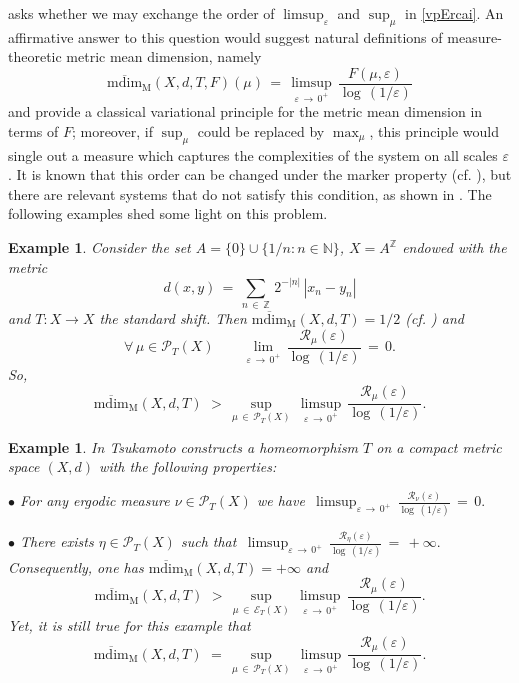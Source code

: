 \documentclass[11pt,a4paper,reqno]{amsart}
\theoremstyle{plain}
\newtheorem{example}[theorem]{Example}
\theoremstyle{definition}
\newcommand{\field}[1]{\mathbb{#1}}
\newcommand{\ZZ}{\field{Z}}
\newcommand{\NN}{\field{N}}
\newcommand{\ep} {\varepsilon}
\newcommand{\vep}{\varepsilon}
\newcommand{\cP}{{\mathcal P}}
\begin{document}
asks whether we may exchange the order of $\limsup_\ep$ and $\sup_\mu$ in \eqref{vpErcai}. An affirmative answer to this question would suggest natural definitions of measure-theoretic metric mean dimension, namely 
$$\mathrm{\overline{mdim}_M}(X,d,T,F)(\mu) \, = \, \limsup_{\varepsilon \, \to \, 0^+}\,\frac{F(\mu, \vep)}{\log\,(1/\varepsilon)}$$
and provide a classical variational principle for the metric mean dimension in terms of $F$; moreover, if $\sup_\mu$ could be replaced by $\max_\mu$, this principle would single out a measure which captures the complexities of the system on all scales $\vep$. It is known that this order can be changed under the marker property (cf. \cite{LT19}), but there are relevant systems that do not satisfy this condition, as shown in \cite{Shi23, TTY}. The following examples shed some light on this problem. 

\smallskip

\begin{example}\cite[Section VIII]{LT18}\label{ex:RT2} \emph{Consider the set $A = \{0\}\cup \{1/n \colon n \in \NN\}$, $X = A^\ZZ$ endowed with the metric
$$d(x,y) \, = \, \sum_{n \, \in \, \ZZ}\, 2^{-|n|} \, |x_n - y_n|$$
and $T \colon X \to X$ the standard shift. Then $\mathrm{\overline{mdim}_M}(X,d,T)= 1/2$ (cf. \cite{VV}) and 
$$\forall \, \mu \in \cP_T(X) \quad \quad \lim_{\vep \, \to \, 0^+}\, \frac{\mathcal{R}_\mu(\vep)}{\log \, (1/\vep)} \, = \, 0.$$
So,
$$\mathrm{\overline{mdim}_M}(X,d,T)\,\, >\, \sup_{\mu \, \in \, \mathcal{P}_T(X)} \,\limsup_{\vep \, \to \, 0^+} \, \frac{\mathcal{R}_\mu(\vep)}{\log \, (1/\vep)}.$$}
\end{example}


\smallskip

\begin{example}\cite[Theorem 1.4]{Tsu2025}\label{ex:RT} \emph{In \cite{Tsu2025} Tsukamoto constructs a homeomorphism $T$ on a compact metric space $(X,d)$ with the following properties:}

\noindent \emph{$\bullet$ For any ergodic measure $\nu \in \cP_T(X)$ we have $\,\displaystyle \limsup_{\vep \, \to \, 0^+} \, \frac{\mathcal{R}_\nu(\vep)}{\log \, (1/\vep)}\, =\, 0.$}

\noindent \emph{$\bullet$ There exists $\eta \in \cP_T(X)$ such that 
$\,\displaystyle \limsup_{\vep \, \to \, 0^+} \, \frac{\mathcal{R}_\eta(\vep)}{\log \, (1/\vep)}\, =\, +\infty.$}\\

\noindent \emph{Consequently, one has $\mathrm{\overline{mdim}_M}(X,d,T) = +\infty$ and
$$\mathrm{\overline{mdim}_M}(X,d,T)\,\, > \,  \sup_{\mu \, \in \, \mathcal{E}_T(X)} \,\limsup_{\vep \, \to \, 0^+} \, \frac{\mathcal{R}_\mu(\vep)}{\log \, (1/\vep)}.$$
Yet, it is still true for this example that 
\begin{equation}\label{ExTsukamoto}
    \mathrm{\overline{mdim}_M}(X,d,T)\,\, =\, \sup_{\mu \, \in \, \mathcal{P}_T(X)} \,\limsup_{\vep \, \to \, 0^+} \, \frac{\mathcal{R}_\mu(\vep)}{\log \, (1/\vep)}.
\end{equation}}
\end{example}
\end{document}
